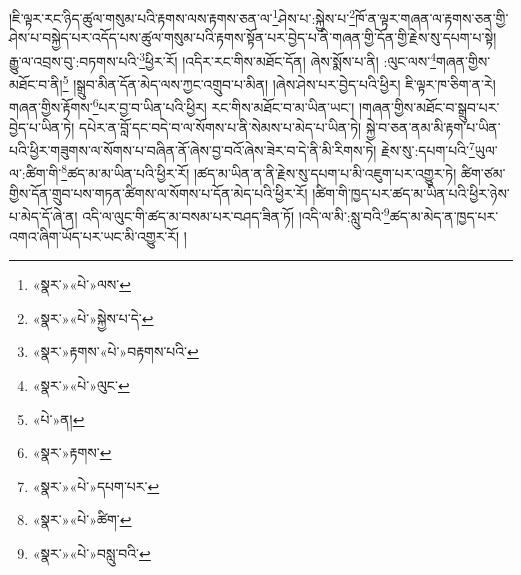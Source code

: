 །ཇི་ལྟར་རང་ཉིད་ཚུལ་གསུམ་པའི་རྟགས་ལས་རྟགས་ཅན་ལ་\footnote{«སྣར་»«པེ་»ལས་}ཤེས་པ་:སྐྱེས་པ་\footnote{«སྣར་»«པེ་»སྐྱེས་པ་དེ་}ཁོ་ན་ལྟར་གཞན་ལ་རྟགས་ཅན་གྱི་ཤེས་པ་བསྐྱེད་པར་འདོད་པས་ཚུལ་གསུམ་པའི་རྟགས་སྟོན་པར་བྱེད་པ་ནི་གཞན་གྱི་དོན་གྱི་རྗེས་སུ་དཔག་པ་སྟེ། རྒྱུ་ལ་འབྲས་བུ་:བཏགས་པའི་\footnote{«སྣར་»རྟགས་«པེ་»བརྟགས་པའི་}ཕྱིར་རོ། །འདིར་རང་གིས་མཐོང་དོན། ཞེས་སྨོས་པ་ནི། :ལུང་ལས་\footnote{«སྣར་»«པེ་»ལུང་}གཞན་གྱིས་མཐོང་བ་ནི།\footnote{«པེ་»ན།} །སྒྲུབ་མིན་དོན་མེད་ལས་ཀྱང་འགྲུབ་པ་མིན། །ཞེས་ཤེས་པར་བྱེད་པའི་ཕྱིར། ཇི་ལྟར་ཁ་ཅིག་ན་རེ། གཞན་གྱིས་རྟོགས་\footnote{«སྣར་»རྟགས་}པར་བྱ་བ་ཡིན་པའི་ཕྱིར། རང་གིས་མཐོང་བ་མ་ཡིན་ཡང་། །གཞན་གྱིས་མཐོང་བ་སྒྲུབ་པར་བྱེད་པ་ཡིན་ཏེ། དཔེར་ན་བློ་དང་བདེ་བ་ལ་སོགས་པ་ནི་སེམས་པ་མེད་པ་ཡིན་ཏེ། སྐྱེ་བ་ཅན་ནམ་མི་རྟག་པ་ཡིན་པའི་ཕྱིར་གཟུགས་ལ་སོགས་པ་བཞིན་ནོ་ཞེས་བྱ་བའོ་ཞེས་ཟེར་བ་དེ་ནི་མི་རིགས་ཏེ། རྗེས་སུ་:དཔག་པའི་\footnote{«སྣར་»«པེ་»དཔག་པར་}ཡུལ་ལ་:ཚིག་གི་\footnote{«སྣར་»«པེ་»ཚིག་}ཚད་མ་མ་ཡིན་པའི་ཕྱིར་རོ། །ཚད་མ་ཡིན་ན་ནི་རྗེས་སུ་དཔག་པ་མི་འཇུག་པར་འགྱུར་ཏེ། ཚིག་ཙམ་གྱིས་དོན་གྲུབ་པས་གཏན་ཚིགས་ལ་སོགས་པ་དོན་མེད་པའི་ཕྱིར་རོ། །ཚིག་གི་ཁྱད་པར་ཚད་མ་ཡིན་པའི་ཕྱིར་ཉེས་པ་མེད་དོ་ཞེ་ན། འདི་ལ་ལུང་གི་ཚད་མ་བསམ་པར་བཤད་ཟིན་ཏོ། །འདི་ལ་མི་:སླུ་བའི་\footnote{«སྣར་»«པེ་»བསླུ་བའི་}ཚད་མ་མེད་ན་ཁྱད་པར་འགའ་ཞིག་ཡོད་པར་ཡང་མི་འགྱུར་རོ། །

